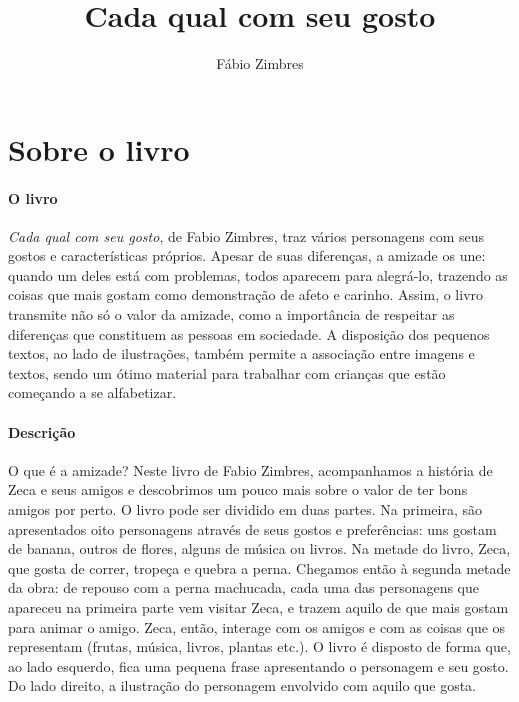 \documentclass[11pt]{extarticle}
\newcommand{\AutorLivro}{Fábio Zimbres}
\newcommand{\TituloLivro}{Cada qual com seu gosto}
\newcommand{\colaborador}{{Paulo Pompermaier e Renier Silva}}
\begin{document}
\title{\TituloLivro}
\author{\AutorLivro}
\def\authornotes{\colaborador}

\date{}
\maketitle


\tableofcontents



\section{Sobre o livro}

\paragraph{O livro} \textit{Cada qual com seu gosto}, de Fabio Zimbres, traz vários personagens com seus gostos e características próprios. Apesar de suas diferenças, a amizade os une: quando um deles está com problemas, todos aparecem para alegrá-lo, trazendo as coisas que mais gostam como demonstração de afeto e carinho.
Assim, o livro transmite não só o valor da amizade, como a importância de respeitar as diferenças que constituem as pessoas em sociedade.
A disposição dos pequenos textos, ao lado de ilustrações, também permite a associação entre imagens e textos, sendo um ótimo material para trabalhar com crianças que estão começando a se alfabetizar.


\paragraph{Descrição} O que é a amizade? Neste livro de Fabio Zimbres, acompanhamos a história de Zeca e seus amigos e descobrimos um pouco mais sobre o valor de ter bons amigos por perto. O livro pode ser dividido em duas partes. Na primeira, são apresentados oito personagens através de seus gostos e preferências: uns gostam de banana, outros de flores, alguns de música ou livros. Na metade do livro, Zeca, que gosta de correr, tropeça e quebra a perna. Chegamos então à segunda metade da obra: de repouso com a perna machucada, cada uma das personagens que apareceu na primeira parte vem visitar Zeca, e trazem aquilo de que mais gostam para animar o amigo. Zeca, então, interage com os amigos e com as coisas que os representam (frutas, música, livros, plantas etc.). O livro é disposto de forma que, ao lado esquerdo, fica uma pequena frase apresentando o personagem e seu gosto. Do lado direito, a ilustração do personagem envolvido com aquilo que gosta. 
\end{document}
